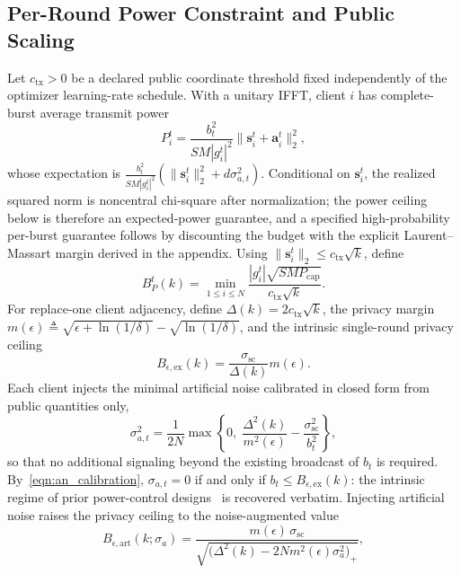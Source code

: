 \documentclass[journal]{IEEEtran}
\begin{document}
\subsection{Per-Round Power Constraint and Public Scaling}
Let $c_{\mathrm{tx}}>0$ be a declared public coordinate threshold fixed independently of the optimizer learning-rate schedule. With a unitary IFFT, client $i$ has complete-burst average transmit power
\begin{equation}
 P_i^t=\frac{b_t^2}{SM|g_i^t|^2}\big\|\mathbf s_i^t+\mathbf a_i^t\big\|_2^2,
\end{equation}
whose expectation is $\frac{b_t^2}{SM|g_i^t|^2}(\|\mathbf s_i^t\|_2^2+d\sigma_{a,t}^2)$. Conditional on $\mathbf s_i^t$, the realized squared norm is noncentral chi-square after normalization; the power ceiling below is therefore an expected-power guarantee, and a specified high-probability per-burst guarantee follows by discounting the budget with the explicit Laurent--Massart margin derived in the appendix. Using $\|\mathbf s_i^t\|_2\le c_{\mathrm{tx}}\sqrt{k}$, define
\begin{equation}
 B_P^t(k)=\min_{1\le i\le N}
 \frac{|g_i^t|\sqrt{SM P_{\mathrm{cap}}}}{c_{\mathrm{tx}}\sqrt{k}}.
 \label{eqn:power}
\end{equation}
For replace-one client adjacency, define $\Delta(k)=2c_{\mathrm{tx}}\sqrt{k}$, the privacy margin $m(\epsilon)\triangleq\sqrt{\epsilon+\ln(1/\delta)}-\sqrt{\ln(1/\delta)}$, and the intrinsic single-round privacy ceiling
\begin{equation}
 B_{\epsilon,\mathrm{ex}}(k)=\frac{\sigma_{\mathrm{sc}}}{\Delta(k)}m(\epsilon).
 \label{eqn:B_eps_exact}
\end{equation}
Each client injects the minimal artificial noise calibrated in closed form from public quantities only,
\begin{equation}
 \sigma_{a,t}^2=\frac{1}{2N}\max\!\left\{0,\;\frac{\Delta^2(k)}{m^2(\epsilon)}-\frac{\sigma_{\mathrm{sc}}^2}{b_t^2}\right\},
 \label{eqn:an_calibration}
\end{equation}
so that no additional signaling beyond the existing broadcast of $b_t$ is required. By~\eqref{eqn:an_calibration}, $\sigma_{a,t}=0$ if and only if $b_t\le B_{\epsilon,\mathrm{ex}}(k)$: the intrinsic regime of prior power-control designs~\cite{liu2020privacy,koda2020differentially} is recovered verbatim. Injecting artificial noise raises the privacy ceiling to the noise-augmented value
\begin{equation}
 B_{\epsilon,\mathrm{art}}(k;\sigma_a)=\frac{m(\epsilon)\,\sigma_{\mathrm{sc}}}{\sqrt{\big(\Delta^2(k)-2Nm^2(\epsilon)\sigma_a^2\big)_+}},
\end{equation}
\end{document}
